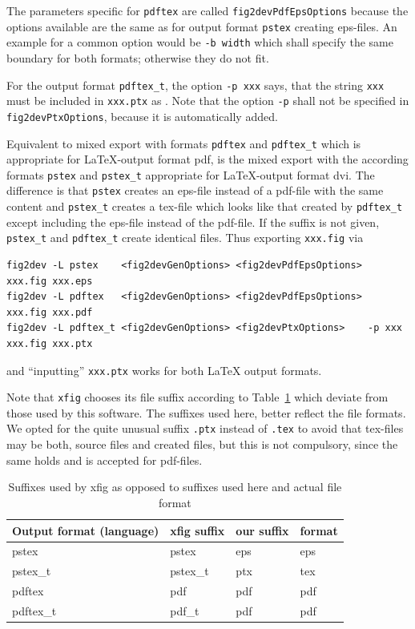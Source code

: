\documentclass[12pt]{book}
\begin{document}

The parameters specific for \texttt{pdftex} 
are called \texttt{fig2devPdfEpsOptions} 
because the options available are the same 
as for output format \texttt{pstex} creating eps-files. 
An example for a common option would be \texttt{-b width} 
which shall specify the same boundary for both formats; 
otherwise they do not fit. 

For the output format \texttt{pdftex\_t}, 
the option \texttt{-p xxx} says, 
that the string \texttt{xxx} must be included in \texttt{xxx.ptx} 
as . 
Note that the option \texttt{-p} shall not be specified 
in \texttt{fig2devPtxOptions}, because it is automatically added. 

Equivalent to mixed export with formats \texttt{pdftex} and \texttt{pdftex\_t} 
which is appropriate for \LaTeX-output format pdf, 
is the mixed export with the according formats 
\texttt{pstex} and \texttt{pstex\_t} appropriate for \LaTeX-output format dvi. 
The difference is that \texttt{pstex} creates an eps-file instead of a pdf-file 
with the same content 
and \texttt{pstex\_t} creates a tex-file which looks like that 
created by \texttt{pdftex\_t} except including the eps-file 
instead of the pdf-file. 
If the suffix is not given, 
\texttt{pstex\_t} and \texttt{pdftex\_t} create identical files. 
Thus exporting \texttt{xxx.fig} via 
%
\begin{Verbatim}[fontsize=\scriptsize]
fig2dev -L pstex    <fig2devGenOptions> <fig2devPdfEpsOptions>        xxx.fig xxx.eps   
fig2dev -L pdftex   <fig2devGenOptions> <fig2devPdfEpsOptions>        xxx.fig xxx.pdf   
fig2dev -L pdftex_t <fig2devGenOptions> <fig2devPtxOptions>    -p xxx xxx.fig xxx.ptx
\end{Verbatim}
%
and ``inputting'' \texttt{xxx.ptx} works for both \LaTeX{} output formats. 


Note that \texttt{xfig} chooses its file suffix 
according to Table~\ref{tab:xfigSuffixes} 
which deviate from those used by this software. 
The suffixes used here, 
better reflect the file formats. 
We opted for the quite unusual suffix \texttt{.ptx} 
instead of \texttt{.tex} 
to avoid that tex-files may be both, 
source files and created files, 
but this is not compulsory, 
since the same holds and is accepted for pdf-files. 

\begin{longtable}{|l|lll|}
\toprule
Output format (language) & xfig suffix & our suffix & format \\
\midrule
\midrule
\endfirsthead%
\bottomrule%
\caption{\label{tab:xfigSuffixes} Suffixes used by xfig as opposed to suffixes
  used here and actual file format }
\endlastfoot%
pstex                    & pstex       & eps        & eps \\
pstex\_t                 & pstex\_t    & ptx        & tex \\
pdftex                   & pdf         & pdf        & pdf \\
pdftex\_t                & pdf\_t      & pdf        & pdf \\
\end{longtable}
\end{document}

